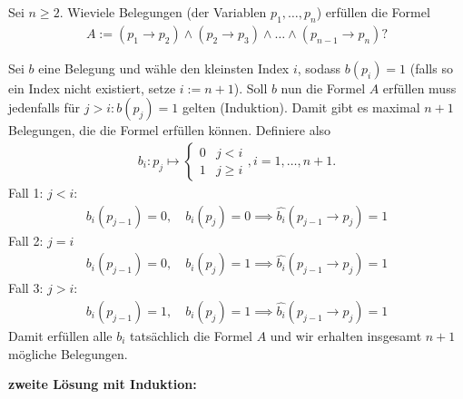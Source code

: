 
\begin{exercise}[22]

Sei $n \geq 2$.
Wieviele Belegungen (der Variablen $p_1,\dots,p_n$) erfüllen die Formel
\begin{align*}
  A := (p_1 \to p_2) \land (p_2 \to p_3) \land \dots \land (p_{n-1} \to p_n)?
\end{align*}

\end{exercise}


\begin{solution}
Sei $b$ eine Belegung und wähle den kleinsten Index $i$, sodass $b(p_i) = 1$
(falls so ein Index nicht existiert, setze $i := n + 1$).
Soll $b$ nun die Formel $A$ erfüllen muss jedenfalls für $j > i: b(p_j) = 1$ gelten (Induktion).
Damit gibt es maximal $n+1$ Belegungen, die die Formel erfüllen können.
Definiere also
\begin{align*}
  b_i: p_j \mapsto \begin{cases}
    0 & j < i \\
    1 & j \geq i
  \end{cases}, i = 1,\dots,n+1.
\end{align*}
Fall 1: $j < i:$
\begin{align*}
  b_i(p_{j-1}) = 0, \quad b_i(p_j) = 0 \implies \hat{b_i}(p_{j-1} \to p_j) = 1
\end{align*}
Fall 2: $j = i$
\begin{align*}
  b_i(p_{j-1}) = 0, \quad b_i(p_j) = 1 \implies \hat{b_i}(p_{j-1} \to p_j) = 1
\end{align*}
Fall 3: $j > i:$
\begin{align*}
  b_i(p_{j-1}) = 1, \quad b_i(p_j) = 1 \implies \hat{b_i}(p_{j-1} \to p_j) = 1
\end{align*}
Damit erfüllen alle $b_i$ tatsächlich die Formel $A$ und wir erhalten insgesamt $n+1$ mögliche Belegungen.
\end{solution}

\textbf{zweite Lösung mit Induktion:}

